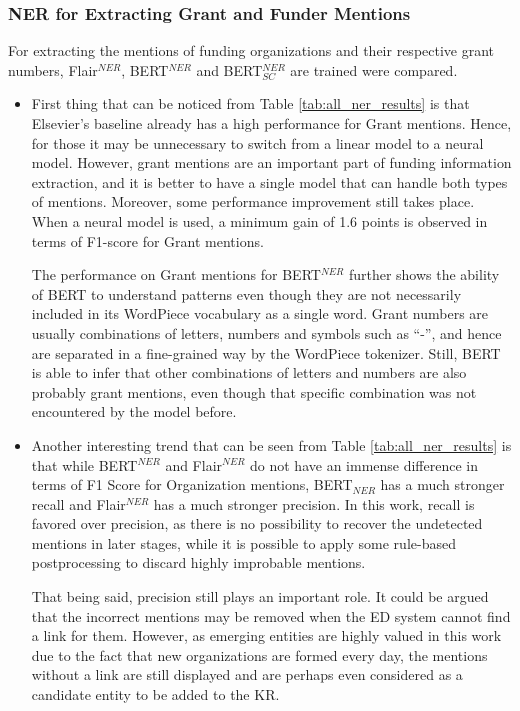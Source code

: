 \documentclass{report}
\theoremstyle{definition}
\theoremstyle{remark}
\begin{document}
\subsubsection{NER for Extracting Grant and Funder Mentions}
For extracting the mentions of funding organizations and their respective grant numbers, Flair$^{NER}$, BERT$^{NER}$ and BERT$^{NER}_{SC}$ are trained were compared.
\begin{itemize}
    \item First thing that can be noticed from Table \ref{tab:all_ner_results} is that Elsevier's baseline already has a high performance for Grant mentions. Hence, for those it may be unnecessary to switch from a linear model to a neural model. However, grant mentions are an important part of funding information extraction, and it is better to have a single model that can handle both types of mentions. Moreover, some performance improvement still takes place. When a neural model is used, a minimum gain of 1.6 points is observed in terms of F1-score for Grant mentions.
    
    The performance on Grant mentions for BERT$^{NER}$  further shows the ability of BERT to understand patterns even though they are not necessarily included in its WordPiece vocabulary as a single word. Grant numbers are usually combinations of letters, numbers and symbols such as ``-'', and hence are separated in a fine-grained way by the WordPiece tokenizer.  Still, BERT is able to infer that other combinations of letters and numbers are also probably grant mentions, even though that specific combination was not encountered by the model before.
    
    \item Another interesting trend that can be seen from Table \ref{tab:all_ner_results} is that while BERT$^{NER}$ and Flair$^{NER}$ do not have an immense difference in terms of F1 Score for Organization mentions, BERT$_{NER}$ has a much stronger recall and Flair$^{NER}$ has a much stronger precision. In this work, recall is favored over precision, as there is no possibility to recover the undetected mentions in later stages, while it is possible to apply some rule-based postprocessing to discard highly improbable mentions.
    
    That being said, precision still plays an important role. It could be argued that the incorrect mentions may be removed when the ED system cannot find a link for them. However, as emerging entities are highly valued in this work due to the fact that new organizations are formed every day, the mentions without a link are still displayed and are perhaps even considered as a candidate entity to be added to the KR.
    

\end{itemize}
\end{document}

